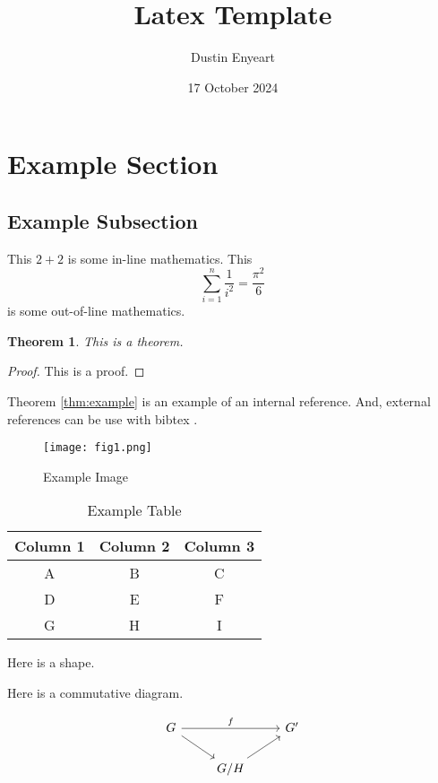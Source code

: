 \documentclass[12pt]{article}
\title{Latex Template}
\author{Dustin Enyeart}
\date{17 October 2024}
\newtheorem{theorem}{Theorem}
\begin{document}
\maketitle %

\section{Example Section}

\subsection{Example Subsection}

This $2+2$ is some in-line mathematics. 
This 
\[
    \sum_{i=1}^n \frac{1}{i^2} = \frac{\pi^2}{6}
\]
is some out-of-line mathematics.

\begin{theorem}
This is a theorem.
\end{theorem}
\label{thm:example}

\begin{proof}
This is a proof. 
\end{proof}

Theorem \ref{thm:example} is an example of an internal reference.
And, external references can be use with bibtex \cite{feynman2014qed, vaswani2017attention, enyeart2024latex}. 

\begin{figure}[H]
    \centering
    \texttt{[image: fig1.png]}
    \caption{Example Image}
\end{figure}


\begin{table}
    \centering
    \caption{Example Table}
    \begin{tabular}{c|c|c}
        Column 1 & Column 2 & Column 3 \\ \hline
        A & B & C \\ \hline
        D & E & F \\ \hline
        G & H & I \\ 
    \end{tabular}
    \label{tab:example}
\end{table}


Here is a shape. 


\begin{center}
\end{center}


Here is a commutative diagram. 

\[
\begin{tikzcd}
    G \arrow{dr} \arrow{rr}{f} & & G' \\
    & G/H \arrow{ur} & \\
\end{tikzcd}
\]


\printbibliography %
\end{document}

